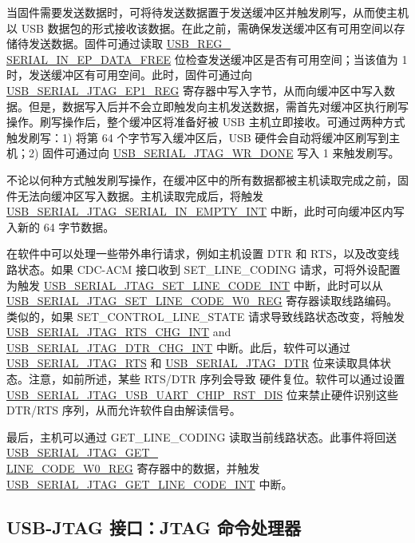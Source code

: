 \documentclass[main\_\_CN.tex]{subfiles}
\begin{document}
当固件需要发送数据时，可将待发送数据置于发送缓冲区并触发刷写，从而使主机以 USB 数据包的形式接收该数据。在此之前，需确保发送缓冲区有可用空间以存储待发送数据。固件可通过读取 \hyperref[fielddesc:USBSERIALJTAGSERIALINEPDATAFREE]{USB\_REG\_\\SERIAL\_IN\_EP\_DATA\_FREE} 位检查发送缓冲区是否有可用空间；当该值为 1 时，发送缓冲区有可用空间。此时，固件可通过向 \hyperref[fielddesc:USBSERIALJTAGRDWRBYTE]{USB\_SERIAL\_JTAG\_EP1\_REG} 寄存器中写入字节，从而向缓冲区中写入数据。但是，数据写入后并不会立即触发向主机发送数据，需首先对缓冲区执行刷写操作。刷写操作后，整个缓冲区将准备好被 USB 主机立即接收。可通过两种方式触发刷写：1) 将第 64 个字节写入缓冲区后，USB 硬件会自动将缓冲区刷写到主机；2) 固件可通过向 \hyperref[fielddesc:USBSERIALJTAGWRDONE]{USB\_SERIAL\_JTAG\_WR\_DONE} 写入 1 来触发刷写。

不论以何种方式触发刷写操作，在缓冲区中的所有数据都被主机读取完成之前，固件无法向缓冲区写入数据。主机读取完成后，将触发 \hyperref[fielddesc:USBSERIALJTAGSERIALINEMPTYINTRAW]{USB\_SERIAL\_JTAG\_SERIAL\_IN\_EMPTY\_INT} 中断，此时可向缓冲区内写入新的 64 字节数据。

在软件中可以处理一些带外串行请求，例如主机设置 DTR 和 RTS，以及改变线路状态。如果 CDC-ACM 接口收到 SET\_LINE\_CODING 请求，可将外设配置为触发 \hyperref[int:USBSERIALJTAGSETLINECODEINT]{USB\_SERIAL\_JTAG\_SET\_LINE\_CODE\_INT} 中断，此时可以从 \hyperref[regdesc:USBSERIALJTAGSETLINECODEW0REG]{USB\_SERIAL\_JTAG\_SET\_LINE\_CODE\_W0\_REG} 寄存器读取线路编码。类似的，如果 SET\_CONTROL\_LINE\_STATE 请求导致线路状态改变，将触发 \hyperref[int:USBSERIALJTAGRTSCHGINT]{USB\_SERIAL\_JTAG\_RTS\_CHG\_INT} and \hyperref[int:USBSERIALJTAGDTRCHGINT]{USB\_SERIAL\_JTAG\_DTR\_CHG\_INT} 中断。此后，软件可以通过 \hyperref[fielddesc:USBSERIALJTAGRTS]{USB\_SERIAL\_JTAG\_RTS} 和 \hyperref[fielddesc:USBSERIALJTAGDTR]{USB\_SERIAL\_JTAG\_DTR} 位来读取具体状态。注意，如前所述，某些 RTS/DTR 序列会导致 \chipname{} 硬件复位。软件可以通过设置 \hyperref[fielddesc:USBSERIALJTAGUSBUARTCHIPRSTDIS]{USB\_SERIAL\_JTAG\_USB\_UART\_CHIP\_RST\_DIS} 位来禁止硬件识别这些 DTR/RTS 序列，从而允许软件自由解读信号。

最后，主机可以通过 GET\_LINE\_CODING 读取当前线路状态。此事件将回送 \hyperref[regdesc:USBSERIALJTAGGETLINECODEW0REG]{USB\_SERIAL\_JTAG\_GET\_\\LINE\_CODE\_W0\_REG} 寄存器中的数据，并触发 \hyperref[int:USBSERIALJTAGGETLINECODEINT]{USB\_SERIAL\_JTAG\_GET\_LINE\_CODE\_INT} 中断。


\subsection{USB-JTAG 接口：JTAG 命令处理器}
\end{document}
